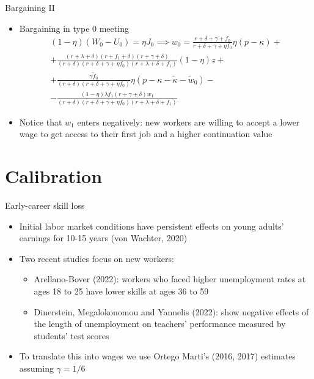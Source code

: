 \documentclass[9pt,xcolor={svgnames}]{beamer}
\begin{document}
\begin{frame}{Bargaining II}
\begin{itemize}
    \setlength\itemsep{1.8em}

     \item Bargaining in type 0 meeting
    \begin{equation*}
    \begin{split}
       (1-\eta)(W_0-U_0) = \eta J_0 \implies w_0 = \frac{r+\delta+\gamma +f_0}{r+\delta+\gamma+\eta f_0}\eta (p-\kappa) + \\ + \frac{(r+\lambda+\delta)(r+f_1+\delta)(r+\gamma+\delta)}{(r+\delta)(r+\delta+\gamma + \eta f_0)(r+\lambda+\delta+f_1)} (1-\eta) z + \\ + \frac{\gamma \tilde{f}_0}{(r+\delta)(r+\delta+\gamma + \eta f_0)}\eta(p-\kappa-\tilde{\kappa}-\tilde{w}_0) - \\ - \frac{(1-\eta)\lambda f_1 (r+\gamma+\delta)w_1}{(r+\delta)(r+\delta+\gamma + \eta f_0)(r+\lambda+\delta+f_1)} 
       \end{split}
    \end{equation*}


    \item Notice that $w_{1}$ enters negatively: new workers are willing to accept a lower wage to get access to their first job and a higher continuation value
    
\end{itemize}
\end{frame}




\section{Calibration} 

\begin{frame}{Early-career skill loss}
\begin{itemize}
\setlength\itemsep{1.8em} 
   
    \item Initial labor market conditions have persistent effects on young adults' earnings for 10-15 years (von Wachter, 2020) 

    \item Two recent studies focus on new workers:
    \smallskip
    \begin{itemize}
        \item Arellano-Bover (2022): workers who faced higher unemployment rates at ages 18 to 25 have lower skills at ages 36 to 59
        \smallskip
        \item Dinerstein, Megalokonomou and Yannelis (2022): show negative effects of the length of unemployment on teachers’ performance measured by students’ test scores
    \end{itemize}

    \item To translate this into wages we use Ortego Marti's (2016, 2017) estimates assuming $\gamma = 1/6$
\end{itemize}
\end{frame}
\end{document}
